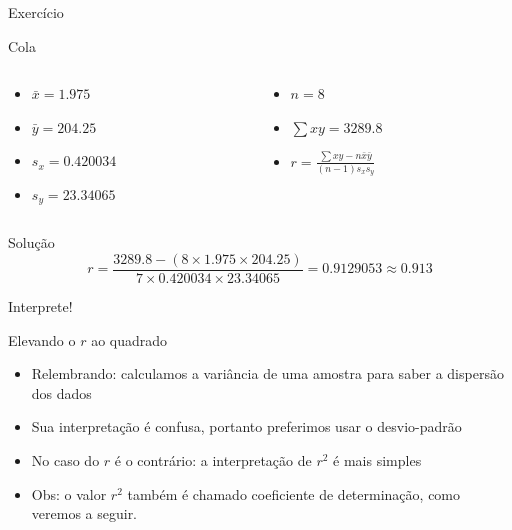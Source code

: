 \documentclass{beamer}
\begin{document}
\begin{frame}{Exercício}
  \begin{block}{Cola}
    \begin{columns}
      \begin{column}{5cm}
        \begin{itemize}
        \item<1->  $\bar{x} = 1.975$
        \item<1->  $\bar{y} = 204.25$
        \item<1->  $s_x = 0.420034$
        \item<1->  $s_y = 23.34065$
        \end{itemize}
      \end{column}
      \begin{column}{5cm}
        \begin{itemize}
        \item<1-> $n = 8$
        \item<1-> $\sum xy = 3289.8$
        \item<1-> $r = \frac{\sum xy - n \bar{x}\bar{y}}{(n-1)s_x s_y}$
        \end{itemize}
      \end{column}
    \end{columns}
  \end{block}
  \begin{block}{Solução}
    \begin{displaymath}
      r = \frac{3289.8 - (8 \times 1.975 \times 204.25)}{7 \times 0.420034 \times 23.34065} = 0.9129053 \approx 0.913
    \end{displaymath}

Interprete!
  \end{block}
\end{frame}

\begin{frame}{Elevando o $r$ ao quadrado}
  \begin{itemize}
  \item Relembrando: calculamos a variância de uma amostra para saber
    a dispersão dos dados
  \item Sua interpretação é confusa, portanto preferimos usar o
    desvio-padrão
  \item No caso do $r$ é o contrário: a interpretação de $r^2$ é mais simples
  \item Obs: o valor $r^2$ também é chamado \alert{coeficiente de
      determinação}, como veremos a seguir.
  \end{itemize}
\end{frame}
\end{document}
